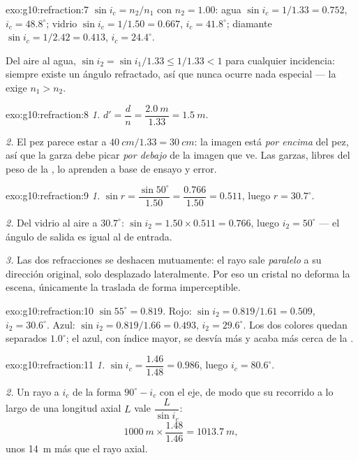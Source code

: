 \begin{solution}{exo:g10:refraction:7}
$\sin i_c = n_2/n_1$ con $n_2 = 1.00$:
agua $\sin i_c = 1/1.33 = 0.752$, $i_c = 48.8^\circ$;
vidrio $\sin i_c = 1/1.50 = 0.667$, $i_c = 41.8^\circ$;
diamante $\sin i_c = 1/2.42 = 0.413$, $i_c = 24.4^\circ$.

Del aire al agua, $\sin i_2 = \sin i_1/1.33 \leq 1/1.33 < 1$ para
cualquier incidencia: siempre existe un ángulo refractado, así que nunca
ocurre nada especial --- la  exige $n_1 > n_2$.
\end{solution}

\begin{solution}{exo:g10:refraction:8}
\emph{1.} $d' = \dfrac{d}{n} = \dfrac{\qty{2.0}{m}}{1.33}
= \qty{1.5}{m}$.

\emph{2.} El pez parece estar a $\qty{40}{cm}/1.33 = \qty{30}{cm}$: la
imagen está \emph{por encima} del pez, así que la garza debe picar
\emph{por debajo} de la imagen que ve. Las garzas, libres del peso de la
, lo aprenden a base de ensayo y error.
\end{solution}

\begin{solution}{exo:g10:refraction:9}
\emph{1.} $\sin r = \dfrac{\sin 50^\circ}{1.50} = \dfrac{0.766}{1.50}
= 0.511$, luego $r = 30.7^\circ$.

\emph{2.} Del vidrio al aire a $30.7^\circ$:
$\sin i_2 = 1.50 \times 0.511 = 0.766$, luego $i_2 = 50^\circ$ --- el
ángulo de salida es igual al de entrada.

\emph{3.} Las dos refracciones se deshacen mutuamente: el rayo sale
\emph{paralelo} a su dirección original, solo desplazado lateralmente.
Por eso un cristal no deforma la escena, únicamente la traslada de forma
imperceptible.
\end{solution}

\begin{solution}{exo:g10:refraction:10}
$\sin 55^\circ = 0.819$. Rojo: $\sin i_2 = 0.819/1.61 = 0.509$,
$i_2 = 30.6^\circ$. Azul: $\sin i_2 = 0.819/1.66 = 0.493$,
$i_2 = 29.6^\circ$. Los dos colores quedan separados $1.0^\circ$; el
azul, con índice mayor, se desvía más y acaba más cerca de la .
\end{solution}

\begin{solution}{exo:g10:refraction:11}
\emph{1.} $\sin i_c = \dfrac{1.46}{1.48} = 0.986$, luego
$i_c = 80.6^\circ$.

\emph{2.} Un rayo a $i_c$ de la  forma $90^\circ - i_c$ con el
eje, de modo que su recorrido a lo largo de una longitud axial $L$ vale
$\dfrac{L}{\sin i_c}$:
\[
\qty{1000}{m} \times \frac{1.48}{1.46} = \qty{1013.7}{m},
\]
unos \qty{14}{m} más que el rayo axial.
\end{solution}

